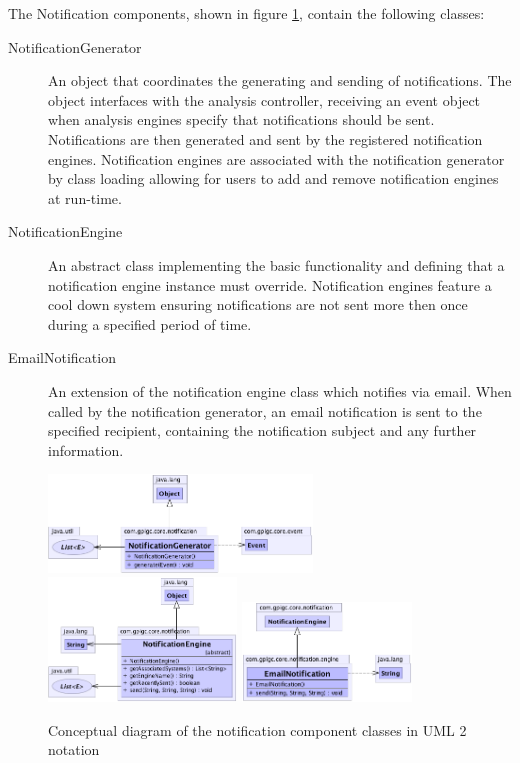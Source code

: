 \documentclass[10pt,a4paper]{article}
\begin{document}
The Notification components, shown in figure \ref{fig:notificationComponent}, 
contain the following classes:
\begin{description}
  \item [NotificationGenerator] An object that coordinates the generating and
    sending of notifications. The object interfaces with the analysis
    controller, receiving an event object when analysis engines specify that
    notifications should be sent. Notifications are then generated and sent by
    the registered notification engines. Notification engines are associated with
    the notification generator by class loading allowing for users to add and
    remove notification engines at run-time.

  \item [NotificationEngine] An abstract class implementing the basic
    functionality and defining that a notification engine instance must
    override. Notification engines feature a cool down system ensuring 
    notifications are not sent more then once during a specified period of 
    time.

  \item [EmailNotification] An extension of the notification engine
    class which notifies via email. When called by the notification
    generator, an email notification is sent to the specified recipient, 
    containing the notification subject and any further information.
\end{description}
 
\begin{figure}[ht!]
  \centering
  \includegraphics[width= 7cm]{images/Notification/NotificationGenerator.png}
  \includegraphics[width= 5cm]{images/Notification/NotificationEngine.png}
  \includegraphics[width= 4.5cm]{images/Notification/EmailNotification.png}
  \caption{Conceptual diagram of the notification component classes in
UML 2 notation}
  \label{fig:notificationComponent}
\end{figure}
\end{document}
